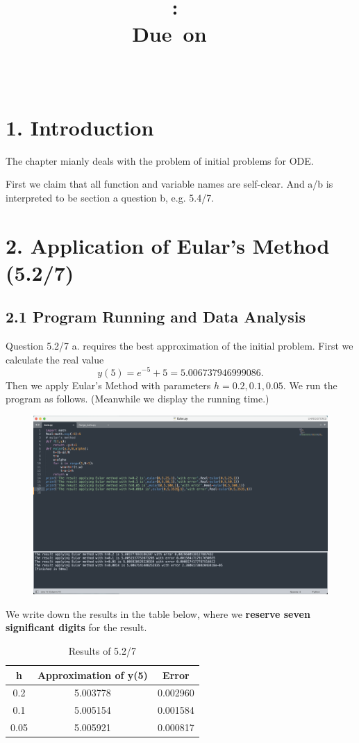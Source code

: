 \documentclass{article}
\title{
    \vspace{2in}
    \textmd{\textbf{\hmwkClass:\ \hmwkTitle}}\\
    \normalsize\vspace{0.1in}\small{Due\ on\ \hmwkDueDate\ }\\
    \vspace{0.1in}\large{\textit{\hmwkClassInstructor\ \hmwkClassTime}}
    \vspace{3in}
}
\author{\hmwkAuthorName}
\date{}
\begin{document}
\maketitle

\pagebreak
\section{1. Introduction}

The chapter mianly deals with the problem of initial problems for ODE.

First we claim that all function and variable names are self-clear. And a/b is interpreted to be section a question b, e.g. 5.4/7.

\section{2. Application of Eular's Method (5.2/7)}

\subsection{2.1 Program Running and Data Analysis }
    
    Question 5.2/7 a. requires the best approximation of the initial problem. First we calculate the real value 
    $$ y(5)=e^{-5}+5=5.006737946999086.
    $$
    Then we apply Eular's Method with parameters $h=0.2,0.1,0.05$. We run the program as follows. (Meanwhile we display the running time.)
    \begin{figure}[h]
    \centering
    \includegraphics[scale=0.25]{Program1}
    \end{figure}

    We write down the results in the table below, where we \textbf{reserve seven significant digits} for the result.
    \begin{table}[htbp]
    \centering
    \caption{Results of 5.2/7}
    \begin{tabular}{c|c|c}
    \toprule
     h & \textbf{Approximation of y(5)} & \textbf{Error} \\ 
    \midrule
    0.2 & 5.003778 & 0.002960 \\
    0.1 & 5.005154 & 0.001584 \\
    0.05 & 5.005921 & 0.000817 \\
    \bottomrule
    \end{tabular}
    \end{table}
\end{document}

